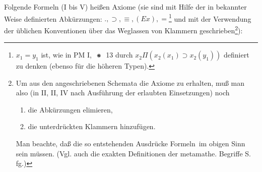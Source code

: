 \documentclass[draft]{scrartcl}
\begin{document}
Folgende Formeln (I bis V) heißen Axiome (sie
sind mit Hilfe der in bekannter Weise definierten Abkürzungen:
$., \supset, \equiv, \left(Ex\right), =$\footnote{$x_1 = y_1$ ist,
wie in PM I, $\pmstar$ 13 durch
$x_2\Pi\left(x_2\left(x_1\right) \supset x_2\left(y_1\right)\right)$
definiert zu denken (ebenso für die höheren Typen).}
und mit der Verwendung der üblichen Konventionen über
das Weglassen von Klammern geschrieben\footnote{Um aus den
angeschriebenen Schemata die Axiome zu erhalten,
muß man also (in II, II, IV nach Ausführung der erlaubten Einsetzungen) noch
\begin{enumerate}
\item die Abkürzungen elimieren,
\item die unterdrückten Klammern hinzufügen.
\end{enumerate}

Man beachte, daß die so entstehenden Ausdrücke \glqq Formeln\grqq\ im obigen Sinn sein müssen. (Vgl. auch die
exakten Definitionen der metamathe. Begriffe S. \pageref{genaueformeln}fg.)}):
\end{document}
